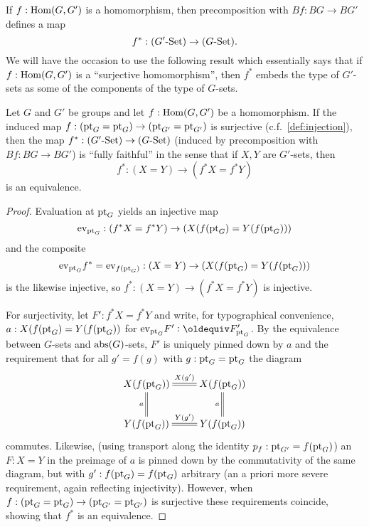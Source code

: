 {If $f:\mathrm{Hom}(G,G')$ is a homomorphism, then precomposition with $Bf:BG\to BG'$ defines a map $$f^*:(G'\text{-}\mathord{\mathrm{Set}})\to(G\text{-}\mathord{\mathrm{Set}}).$$
We will have the occasion to use the following result which essentially says that if $f:\mathrm{Hom}(G,G')$ is a ``surjective homomorphism'', then $f^*$ embeds the type of $G'$-sets as some of the components of the type of $G$-sets.
\begin{lemma}
  \label{lem:epifullyfaithful}
  Let $G$ and $G'$ be groups and let $f:\mathrm{Hom}(G,G')$ be a homomorphism.  If the induced map $f:(\mathrm{pt}_G=\mathrm{pt}_G)\to(\mathrm{pt}_{G'}=\mathrm{pt}_{G'})$ is surjective (c.f.~\cref{def:injection}), then the map $f^*:(G'\text{-}\mathord{\mathrm{Set}})\to(G\text{-}\mathord{\mathrm{Set}})$ (induced by precomposition with $Bf:BG\to BG'$) is ``fully faithful'' in the sense that if $X,Y$ are $G'$-sets, then
$$f^*:(X=Y)\to(f^*X=f^*Y)
$$
is an equivalence.
\end{lemma}
\begin{proof}
  Evaluation at $\mathrm{pt}_G$  yields an injective map 
$$\mathrm{ev}_{\mathrm{pt}_G}:(f^*X=f^*Y)\to(X(f(\mathrm{pt}_G)=Y(f(\mathrm{pt}_G)))$$ and the composite 
$$\mathrm{ev}_{\mathrm{pt}_G}f^*=\mathrm{ev}_{f(\mathrm{pt}_G)}:(X=Y)\to(X(f(\mathrm{pt}_G)=Y(f(\mathrm{pt}_G)))$$
 is the likewise injective, so $f^*:(X=Y)\to(f^*X=f^*Y)$ is injective. 

For surjectivity, let $F':f^*X=f^*Y$ and write, for typographical convenience, $a:X(f(\mathrm{pt}_G)=Y(f(\mathrm{pt}_G))$ for $\mathrm{ev}_{\pt_G}F'\defequi F'_{\pt_G}$.  
By the equivalence between $G$-sets and $\mathrm{abs}(G)$-sets, $F'$ is uniquely pinned down by $a$ and the requirement that for all $g'=f(g)$ with $g:\mathrm{pt}_G=\mathrm{pt}_G$ the diagram 
$$\xymatrix{X(f(\pt_G))\ar@{=}[r]^{X({g'})}\ar@{=}[d]_{a}&
  X(f(\pt_G))\ar@{=}[d]_{a}\\
  Y(f(\pt_G))\ar@{=}[r]^{Y({g'})}&Y(f(\pt_G))}
$$
commutes.  Likewise, (using transport along the identity $p_f:\mathrm{pt}_{G'}=f(\mathrm{pt}_G)$) an $F:X=Y$ in the preimage of $a$ is pinned down by the commutativity of the same diagram, but with $g':f(\mathrm{pt}_G)=f(\mathrm{pt}_G)$ arbitrary (an a priori more severe requirement, again reflecting injectivity).   However, when $f:(\mathrm{pt}_G=\mathrm{pt}_G)\to(\mathrm{pt}_{G'}=\mathrm{pt}_{G'})$ is surjective these requirements coincide, showing that $f^*$ is an equivalence.






\end{proof}}
